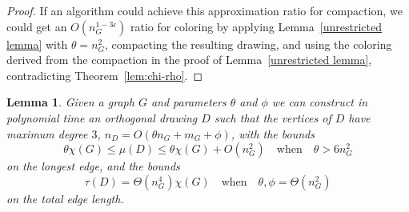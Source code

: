 \documentclass[12pt]{article}
\newtheorem{lemma}[theorem]{Lemma}
\theoremstyle{definitions}
\begin{document}
\begin{proof}
If an algorithm could achieve this approximation ratio for compaction, we could get an $O(n_G^{1-3\epsilon})$ ratio for coloring by applying Lemma~\ref{unrestricted lemma} with \mbox{$\theta=n_G^2$}, compacting the resulting drawing, and using the coloring derived from the compaction in the proof of Lemma~\ref{unrestricted lemma}, contradicting Theorem~\ref{lem:chi-rho}.
\end{proof}
\newpage
\begin{lemma}
\label{lem:vxvlong}
Given a graph $G$ and parameters $\theta$ and $\phi$ we can construct in polynomial time an orthogonal drawing $D$ such that the vertices of $D$ have maximum degree $3$, $n_D = O(\theta n_G + m_G + \phi)$, with the bounds
\[
\theta \chi(G) \leq \mu(D) \leq \theta\chi(G) + O(n_G^2) \quad\text{when}\quad \theta > 6n_G^2
\]
on the longest edge, and the bounds
\[
\tau(D) = \Theta(n_G^4) \chi(G)
\quad\text{when}\quad \theta,\phi = \Theta(n_G^2)
\]
on the total edge length.
\end{lemma}
\end{document}
